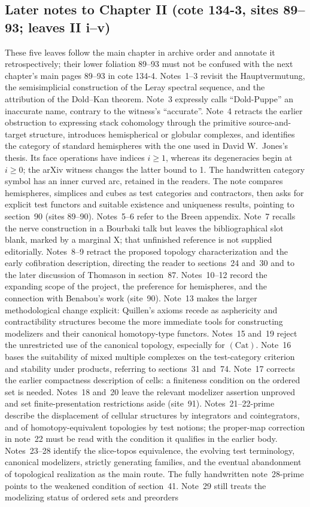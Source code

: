 \subsection*{Later notes to Chapter II (cote 134-3, sites 89--93; leaves II i--v)}
These five leaves follow the main chapter in archive order and annotate it retrospectively; their lower foliation 89--93 must not be confused with the next chapter's main pages 89--93 in cote 134-4. Notes~1--3 revisit the Hauptvermutung, the semisimplicial construction of the Leray spectral sequence, and the attribution of the Dold--Kan theorem. Note~3 expressly calls ``Dold-Puppe'' an inaccurate name, contrary to the witness's ``accurate''. Note~4 retracts the earlier obstruction to expressing stack cohomology through the primitive source-and-target structure, introduces hemispherical or globular complexes, and identifies the category of standard hemispheres with the one used in David W.~Jones's thesis. Its face operations have indices $i\geq1$, whereas its degeneracies begin at $i\geq0$; the arXiv witness changes the latter bound to 1. The handwritten category symbol has an inner curved arc, retained in the readers. The note compares hemispheres, simplices and cubes as test categories and contractors, then asks for explicit test functors and suitable existence and uniqueness results, pointing to section~90 (sites 89--90). Notes~5--6 refer to the Breen appendix. Note~7 recalls the nerve construction in a Bourbaki talk but leaves the bibliographical slot blank, marked by a marginal X; that unfinished reference is not supplied editorially. Notes~8--9 retract the proposed topology characterization and the early cofibration description, directing the reader to sections~24 and~30 and to the later discussion of Thomason in section~87. Notes~10--12 record the expanding scope of the project, the preference for hemispheres, and the connection with Benabou's work (site~90). Note~13 makes the larger methodological change explicit: Quillen's axioms recede as asphericity and contractibility structures become the more immediate tools for constructing modelizers and their canonical homotopy-type functors. Notes~15 and~19 reject the unrestricted use of the canonical topology, especially for $(\mathrm{Cat})$. Note~16 bases the suitability of mixed multiple complexes on the test-category criterion and stability under products, referring to sections~31 and~74. Note~17 corrects the earlier compactness description of cells: a finiteness condition on the ordered set is needed. Notes~18 and~20 leave the relevant modelizer assertion unproved and set finite-presentation restrictions aside (site~91). Notes~21--22-prime describe the displacement of cellular structures by integrators and cointegrators, and of homotopy-equivalent topologies by test notions; the proper-map correction in note~22 must be read with the condition it qualifies in the earlier body. Notes~23--28 identify the slice-topos equivalence, the evolving test terminology, canonical modelizers, strictly generating families, and the eventual abandonment of topological realization as the main route. The fully handwritten note~28-prime points to the weakened condition of section~41. Note~29 still treats the modelizing status of ordered sets and preorders 